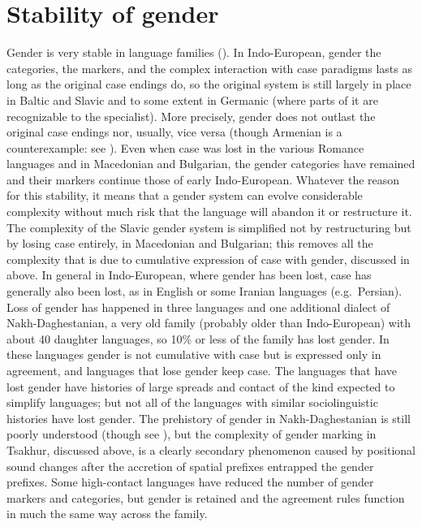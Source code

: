 \documentclass[output=collectionpaper]{langsci/langscibook}
\begin{document}
\section{Stability of gender}
Gender is very stable in language families (\citealt{Matasovic2007,Matasovic2014}). In Indo-\linebreak[4]{}European, gender \textendash{} the categories, the markers, and the complex interaction with case para\-digms \textendash{} lasts as long as the original case endings do, so the original system is still largely in place in Baltic and Slavic and to some extent in Germanic (where parts of it are recognizable to the specialist). More precisely, gender does not outlast the original case endings \textendash{} nor, usually, vice versa (though Armenian is a counterexample: see \citealt{Kulikov2006}). Even when case was lost in the various Romance languages and in Macedonian and Bulgarian, the gender categories have remained and their markers continue those of early Indo-European. Whatever the reason for this stability, it means that a gender system can evolve considerable complexity without much risk that the language will abandon it or restructure it. The complexity of the Slavic gender system is simplified not by restructuring but by losing case entirely, in Macedonian and Bulgarian; this removes all the complexity that is due to cumulative expression of case with gender, discussed in  above. In general in Indo-European, where gender has been lost, case has generally also been lost, as in English or some Iranian languages (e.g.\ Persian). Loss of gender has happened in three languages and one additional dialect of Nakh-Daghestanian, a very old family (probably older than Indo-European) with about 40 daughter languages, so 10\% or less of the family has lost gender. In these languages gender is not cumulative with case but is expressed only in agreement, and languages that lose gender keep case. The languages that have lost gender have histories of large spreads and contact of the kind expected to simplify languages; but not all of the languages with similar sociolinguistic histories have lost gender. The prehistory of gender in Nakh-Daghestanian is still poorly understood (though see \citealt{Schulze1998}), but the complexity of gender marking in Tsakhur, discussed above, is a clearly secondary phenomenon caused by positional sound changes after the accretion of spatial prefixes entrapped the gender prefixes. Some high-contact languages have reduced the number of gender markers and categories, but gender is retained and the agreement rules function in much the same way across the family.
\end{document}
